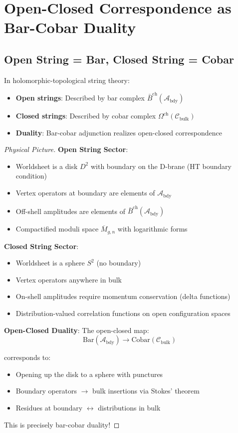\section{Open-Closed Correspondence as Bar-Cobar Duality}

\subsection{Open String = Bar, Closed String = Cobar}

\begin{theorem}
In holomorphic-topological string theory:
\begin{itemize}
\item \textbf{Open strings}: Described by bar complex $\bar{B}^{\text{ch}}(\mathcal{A}_{\text{bdy}})$
\item \textbf{Closed strings}: Described by cobar complex $\Omega^{\text{ch}}(\mathcal{C}_{\text{bulk}})$
\item \textbf{Duality}: Bar-cobar adjunction realizes open-closed correspondence
\end{itemize}
\end{theorem}

\begin{proof}[Physical Picture]
\textbf{Open String Sector}:
\begin{itemize}
\item Worldsheet is a disk $D^2$ with boundary on the D-brane (HT boundary condition)
\item Vertex operators at boundary are elements of $\mathcal{A}_{\text{bdy}}$
\item Off-shell amplitudes are elements of $\bar{B}^{\text{ch}}(\mathcal{A}_{\text{bdy}})$
\item Compactified moduli space $\overline{M}_{g,n}$ with logarithmic forms
\end{itemize}

\textbf{Closed String Sector}:
\begin{itemize}
\item Worldsheet is a sphere $S^2$ (no boundary)
\item Vertex operators anywhere in bulk
\item On-shell amplitudes require momentum conservation (delta functions)
\item Distribution-valued correlation functions on open configuration spaces
\end{itemize}

\textbf{Open-Closed Duality}:
The open-closed map:
$$\text{Bar}(\mathcal{A}_{\text{bdy}}) \to \text{Cobar}(\mathcal{C}_{\text{bulk}})$$

corresponds to:
\begin{itemize}
\item Opening up the disk to a sphere with punctures
\item Boundary operators $\to$ bulk insertions via Stokes' theorem
\item Residues at boundary $\leftrightarrow$ distributions in bulk
\end{itemize}

This is precisely bar-cobar duality!
\end{proof}

